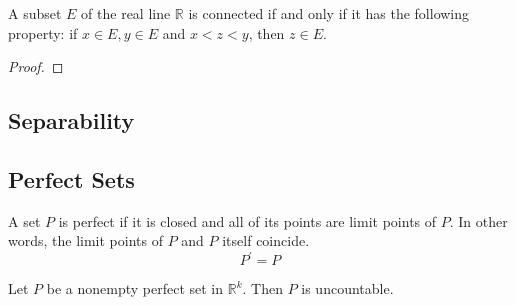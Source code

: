   \begin{theorem}
  A subset $E$ of the real line $\mathbb{R}$ is connected if and only if it has the following property: if $x \in E, y \in E$ and $x < z < y$, then $z \in E$. 
  \end{theorem}
  \begin{proof}

  \end{proof}

\subsection{Separability}

\subsection{Perfect Sets}

  \begin{definition}
    A set $P$ is perfect if it is closed and all of its points are limit points of $P$. In other words, the limit points of $P$ and $P$ itself coincide. 
    \begin{equation}
      P^\prime = P
    \end{equation}
  \end{definition}

  \begin{theorem}
    Let $P$ be a nonempty perfect set in $\mathbb{R}^k$. Then $P$ is uncountable. 
  \end{theorem}

